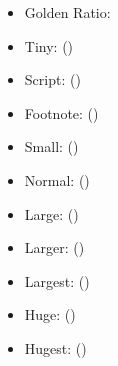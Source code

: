 {\begin{minipage}[t]{0.33\textwidth}
    \begin{itemize}
      \item Golden Ratio: \goldenratio
      \item Tiny: \tinyfontsize (\tinyfontheight)
      \item Script: \scriptfontsize (\scriptfontheight)
      \item Footnote: \footnotefontsize (\footnotefontheight)
      \item Small: \smallfontsize (\smallfontheight)
      \item Normal: \normalfontsize (\normalfontheight)
      \item Large: \largefontsize (\largefontheight)
      \item Larger: \largerfontsize (\largerfontheight)
      \item Largest: \largestfontsize (\largestfontheight)
      \item Huge: \hugefontsize (\hugefontheight)
      \item Hugest: \hugestfontsize (\hugestfontheight)
    \end{itemize}
  \end{minipage}

}
